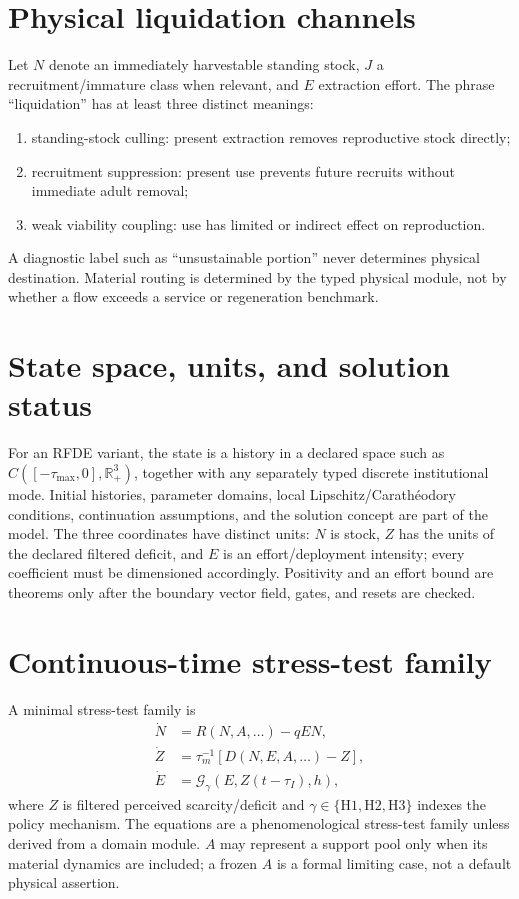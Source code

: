 \documentclass[11pt]{article}
\begin{document}
\section{Physical liquidation channels}
Let $N$ denote an immediately harvestable standing stock, $J$ a recruitment/immature class when relevant, and $E$ extraction effort. The phrase ``liquidation'' has at least three distinct meanings:
\begin{enumerate}
\item standing-stock culling: present extraction removes reproductive stock directly;
\item recruitment suppression: present use prevents future recruits without immediate adult removal;
\item weak viability coupling: use has limited or indirect effect on reproduction.
\end{enumerate}
A diagnostic label such as ``unsustainable portion'' never determines physical destination. Material routing is determined by the typed physical module, not by whether a flow exceeds a service or regeneration benchmark.

\section{State space, units, and solution status}
For an RFDE variant, the state is a history in a declared space such as $C([-\tau_{\max},0],\mathbb R_+^3)$, together with any separately typed discrete institutional mode. Initial histories, parameter domains, local Lipschitz/Carath\'eodory conditions, continuation assumptions, and the solution concept are part of the model. The three coordinates have distinct units: $N$ is stock, $Z$ has the units of the declared filtered deficit, and $E$ is an effort/deployment intensity; every coefficient must be dimensioned accordingly. Positivity and an effort bound are theorems only after the boundary vector field, gates, and resets are checked.

\section{Continuous-time stress-test family}
A minimal stress-test family is
\begin{align}
\dot N&=R(N,A,\ldots)-qE N,\label{eq:N}\\
\dot Z&=\tau_m^{-1}[D(N,E,A,\ldots)-Z],\label{eq:Z}\\
\dot E&=\mathcal G_\gamma(E,Z(t-\tau_I),h),\label{eq:E}
\end{align}
where $Z$ is filtered perceived scarcity/deficit and $\gamma\in\{\mathrm{H1,H2,H3}\}$ indexes the policy mechanism. The equations are a phenomenological stress-test family unless derived from a domain module. $A$ may represent a support pool only when its material dynamics are included; a frozen $A$ is a formal limiting case, not a default physical assertion.
\end{document}
